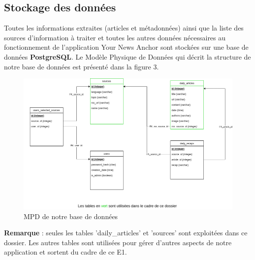 \documentclass[french]{article}
\begin{document}
    \subsection{Stockage des données}

    Toutes les informations extraites (articles et métadonnées) ainsi que la liste des sources d'information à traiter et toutes les autres données nécessaires au fonctionnement de l'application Your News Anchor sont stockées sur une base de données \textbf{PostgreSQL}. Le Modèle Physique de Données qui décrit la structure de notre base de données est présenté dans la figure 3.

    \begin{figure}[h]
        \includegraphics[width=12cm]{mpd_e1}
        \centering
        \caption{MPD de notre base de données}
        \centering
    \end{figure}

    \textbf{Remarque} : seules les tables 'daily\_articles' et 'sources' sont exploitées dans ce dossier. Les autres tables sont utilisées pour gérer d'autres aspects de notre application et sortent du cadre de ce E1.
\end{document}

